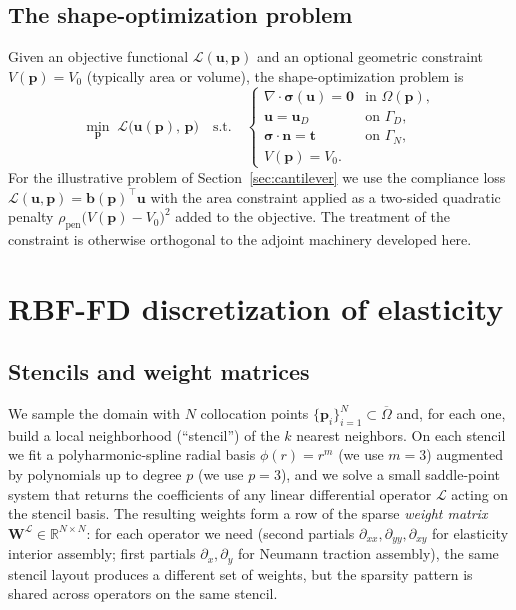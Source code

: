 \documentclass[11pt,a4paper]{article}
\newcommand{\mat}[1]{\mathbf{#1}}
\newcommand{\vect}[1]{\boldsymbol{#1}}
\newcommand{\pts}{\vect{p}}
\newcommand{\reals}{\mathbb{R}}
\newcommand{\Loss}{\mathcal{L}}
\begin{document}
\subsection{The shape-optimization problem}

Given an objective functional $\Loss(\vect u, \pts)$ and an optional
geometric constraint $V(\pts) = V_0$ (typically area or volume), the
shape-optimization problem is
\begin{equation}
  \min_{\pts}\; \Loss\big(\vect u(\pts),\, \pts\big)
  \quad \text{s.t.}\quad
  \begin{cases}
    \nabla\!\cdot\!\vect\sigma(\vect u) = \vect 0
      & \text{in } \Omega(\pts), \\
    \vect u = \vect u_D & \text{on } \Gamma_D, \\
    \vect\sigma\!\cdot\!\vect n = \vect t & \text{on } \Gamma_N, \\
    V(\pts) = V_0.
  \end{cases}
  \label{eq:shape-opt}
\end{equation}
For the illustrative problem of Section~\ref{sec:cantilever} we use the
compliance loss
$\Loss(\vect u, \pts) = \vect b(\pts)^\top \vect u$ with the area
constraint applied as a two-sided quadratic penalty
$\rho_{\text{pen}}\big(V(\pts) - V_0\big)^2$ added to the objective.
The treatment of the constraint is otherwise orthogonal to the
adjoint machinery developed here.

\section{RBF-FD discretization of elasticity}
\label{sec:discretization}

\subsection{Stencils and weight matrices}

We sample the domain with $N$ collocation points
$\{\pts_i\}_{i=1}^N \subset \overline\Omega$ and, for each one, build
a local neighborhood (``stencil'') of the $k$ nearest neighbors.
On each stencil we fit a polyharmonic-spline radial basis
$\phi(r) = r^m$ (we use $m=3$) augmented by polynomials up to degree
$p$ (we use $p=3$), and we solve a small saddle-point system that
returns the coefficients of any linear differential operator
$\mathcal L$ acting on the stencil basis. The resulting weights form
a row of the sparse \emph{weight matrix}
$\mat W^{\mathcal L} \in \reals^{N \times N}$: for each operator we
need (second partials $\partial_{xx}, \partial_{yy}, \partial_{xy}$
for elasticity interior assembly; first partials $\partial_x,
\partial_y$ for Neumann traction assembly), the same stencil layout
produces a different set of weights, but the sparsity pattern is
shared across operators on the same stencil.
\end{document}
